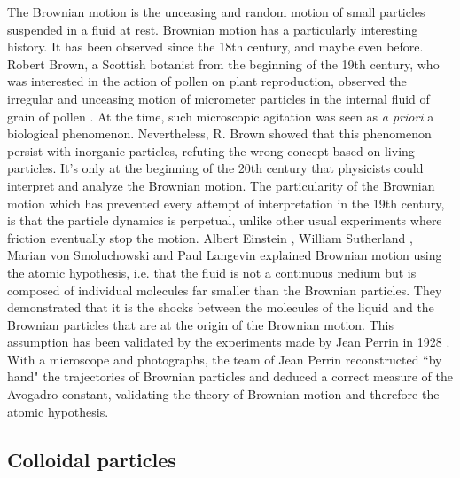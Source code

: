 \documentclass[%
 aip,
 jmp,%
 amsmath,amssymb,
reprint,%
]{revtex4-1}
\begin{document}
The Brownian motion is the unceasing and random motion of small particles suspended in a fluid at rest. Brownian motion has a particularly interesting history. It has been observed since the 18th century, and maybe even before. Robert Brown, a Scottish botanist from the beginning of the 19th century, who was interested in the action of pollen on plant reproduction, observed the irregular and unceasing motion of micrometer particles in the internal fluid of grain of pollen \citep{13_brown1828brief}. At the time, such microscopic agitation was seen as \textit{a priori} a biological phenomenon. Nevertheless, R. Brown showed that this phenomenon persist with inorganic particles, refuting the wrong concept based on living particles. It's only at the beginning of the 20th century that physicists could interpret and analyze the Brownian motion. The particularity of the Brownian motion which has prevented every attempt of interpretation in the 19th century, is that the particle dynamics is perpetual, unlike other usual experiments where friction eventually stop the motion. Albert Einstein \citep{9_einstein1906theory}, William Sutherland \citep{14_sutherland1905lxxv}, Marian von Smoluchowski \citep{10_von1906kinetischen} and Paul Langevin \citep{15_Langevin} explained Brownian motion using the atomic hypothesis, i.e. that the fluid is not a continuous medium but is composed of individual molecules far smaller than the Brownian particles. They demonstrated that it is the shocks between the molecules of the liquid and the Brownian particles that are at the origin of the Brownian motion. This assumption has been validated by the experiments made by Jean Perrin in 1928 \citep{22_perrin2014atomes}. With a microscope and photographs, the team of Jean Perrin reconstructed ``by hand" the trajectories of Brownian particles and deduced a correct measure of the Avogadro constant, validating the theory of Brownian motion and therefore the atomic hypothesis.

\subsection{Colloidal particles}
\end{document}
